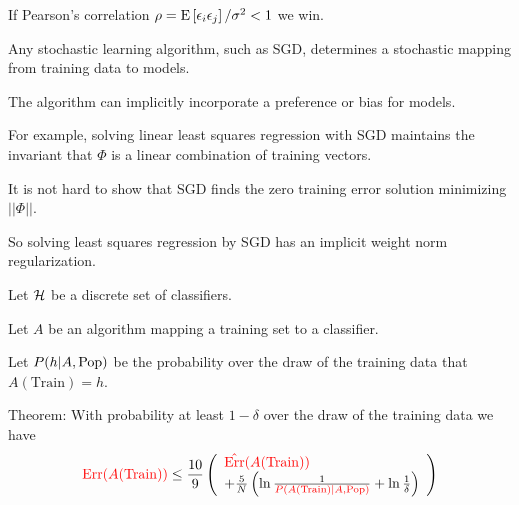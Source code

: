 {{\vfill
If Pearson's correlation $\rho = \mathrm{E}\left[\epsilon_i\epsilon_j\right]/\sigma^2 < 1$ we win.
}



Any stochastic learning algorithm, such as SGD, determines a stochastic mapping from training data to models.

\vfill
The algorithm can implicitly incorporate a preference or bias for models.

\vfill
For example, solving linear least squares regression with SGD maintains the invariant that $\Phi$ is a linear combination of training vectors.

\vfill
It is not hard to show that SGD finds the zero training error solution minimizing $||\Phi||$.

\vfill
So solving least squares regression by SGD has an implicit weight norm regularization.


Let ${\cal H}$ be a discrete set of classifiers.

\vfill
Let $A$ be an algorithm mapping a training set to a classifier.

\vfill
Let $P(h | A,\mathrm{Pop})$ be the probability over the draw of the training data that $A(\mathrm{Train}) = h$.

\vfill
Theorem: With probability at least $1-\delta$ over the draw of the training data we have
$${\color{red} \mathrm{Err}(A(\mathrm{Train}))} \leq \frac{10}{9}\left(\begin{array}{l} {\color{red} \hat{\mathrm{Err}}(A(\mathrm{Train}))}
 \\+ \frac{5}{N}\left(
\ln \frac{1}{{\color{red} P(A(\mathrm{Train})|A,\mathrm{Pop})}} + \ln \frac{1}{\delta}\right)\end{array}\right)$$


}
